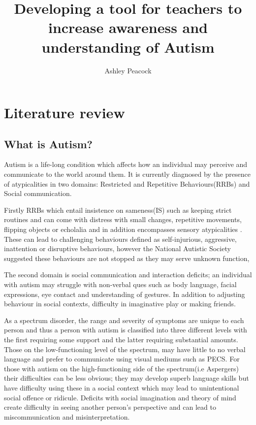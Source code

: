 \documentclass[11pt]{report}
\begin{document}
\title{Developing a tool for teachers to increase awareness and understanding of Autism}
\author{Ashley Peacock}
\maketitle
\tableofcontents
\chapter{Literature review}

\section{What is Autism?}

Autism is a life-long condition which affects how an individual may perceive and communicate to the world around them\cite{nas}. It is currently diagnosed by the presence of atypicalities in two domains: Restricted and Repetitive Behaviours(RRBs) and Social communication.

Firstly RRBs which entail insistence on sameness(IS) such as keeping strict routines and can come with distress with small changes, repetitive movements, flipping objects or echolalia and in addition encompasses sensory atypicalities \cite{dsm52}. These can lead to challenging behaviours defined as self-injurious, aggressive, inattention or disruptive behaviours\cite{teacherchallenge}, however the National Autistic Society suggested these behaviours are not stopped as they may serve unknown function,
 
The second domain is social communication and interaction deficits; an individual with autism may struggle with non-verbal ques such as body language, facial expressions, eye contact and understanding of gestures. In addition to adjusting behaviour in social contexts, difficulty in imaginative play or making friends.  

As a spectrum disorder, the range and severity of symptoms are unique to each person and thus a person with autism is classified into three different levels with the first requiring some support and the latter requiring substantial amounts\cite{dsm52}. Those on the low-functioning level of the spectrum, may have little to no verbal language and prefer to communicate using visual mediums such as PECS. For those with autism on the high-functioning side of the spectrum(i.e Aspergers) their difficulties can be less obvious; they may develop superb language skills but have difficulty using these in a social context which may lead to unintentional social offence or ridicule. Deficits with social imagination and theory of mind create difficulty in seeing another person's perspective and can lead to miscommunication and misinterpretation. 
\end{document}
